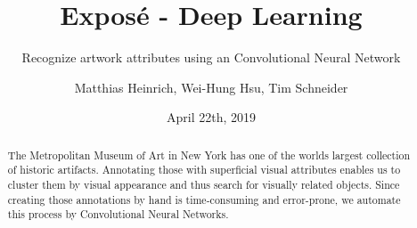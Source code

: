 \documentclass[10pt,a4paper,twocolumn,DIV18]{scrartcl}
\title{Expos\'e - Deep Learning}
\subtitle{Recognize artwork attributes using an Convolutional Neural Network}
\author{Matthias Heinrich, Wei-Hung Hsu, Tim Schneider}
\date{April 22th, 2019}
\begin{document}
  

\maketitle
\begin{abstract}
    The Metropolitan Museum of Art in New York has one of the worlds largest collection of historic artifacts.
    Annotating those with superficial visual attributes enables us to cluster them by visual appearance and thus search for visually related objects.
    Since creating those annotations by hand is time-consuming and error-prone, we automate this process by Convolutional Neural Networks.
\end{abstract}

%






\end{document}
